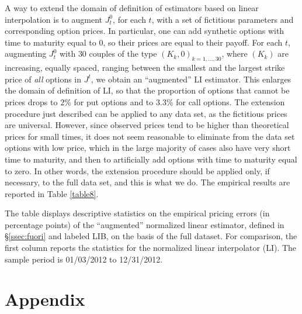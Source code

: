 \documentclass[11pt]{article}
\theoremstyle{remark}
\begin{document}
A way to extend the domain of definition of estimators based on linear
interpolation is to augment $J_t^0$, for each $t$, with a set of
fictitious parameters and corresponding option prices. In particular,
one can add synthetic options with time to maturity equal to $0$, so
their prices are equal to their payoff. For each $t$, augmenting
$J_t^0$ with $30$ couples of the type $(K_k,0)_{k=1,\ldots,30}$, where
$(K_k)$ are increasing, equally spaced, ranging between the smallest
and the largest strike price of \emph{all} options in $J^t$, we obtain
an ``augmented'' LI estimator. This enlarges the domain of definition
of LI, so that the proportion of options that cannot be prices drops
to $2$\% for put options and to $3.3$\% for call options. The
extension procedure just described can be applied to any data set, as
the fictitious prices are universal. However, since observed prices
tend to be higher than theoretical prices for small times, it does not
seem reasonable to eliminate from the data set options with low price,
which in the large majority of cases also have very short time to
maturity, and then to artificially add options with time to maturity
equal to zero. In other words, the extension procedure should be
applied only, if necessary, to the full data set, and this is what we
do. The empirical results are reported in Table \ref{table8}.
%
\begin{table}[tbp]
\caption{Linear estimator with fictitious options}
\begin{center}
\vspace{2mm}
\parbox{\textwidth}{\footnotesize The table displays descriptive
  statistics on the empirical pricing errors (in percentage points) of
  the ``augmented'' normalized linear estimator, defined in
  \S\ref{ssec:fuori} and labeled LIB, on the basis of the full
  dataset. For comparison, the first column reports the statistics for
  the normalized linear interpolator (LI). The sample period is
  01/03/2012 to 12/31/2012. \vspace{4mm}}
\footnotesize{{}}
\end{center}
\label{table8}
\end{table}



\appendix
\section{Appendix}
\end{document}

